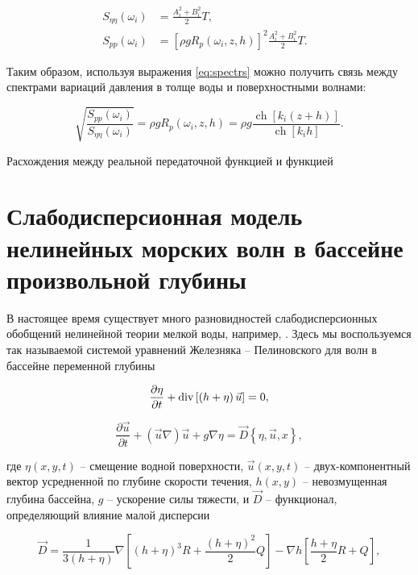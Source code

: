 \begin{align}\label{eq:spectrs}
S_{\eta\eta}(\omega_i)&=\frac{A_i^2+B_i^2}{2}T,&\\
S_{pp}(\omega_i)&=[\rho gR_p(\omega_i,z,h)]^2\frac{A_i^2+B_i^2}{2}T.&
\end{align}

Таким образом, используя выражения \eqref{eq:spectrs} можно получить связь между спектрами вариаций давления в толще воды и поверхностными волнами:

\begin{equation}\label{eq:spectrsRelat}
  \sqrt{\frac{S_{pp}(\omega_i)}{S_{\eta\eta}(\omega_i)}}=\rho gR_p(\omega_i,z,h)=\rho g\frac{\operatorname{ch}[k_i(z+h)]}{\operatorname{ch}[k_ih]}.
\end{equation}
\noindent

Расхождения между реальной передаточной функцией и функцией 

\section{Слабодисперсионная модель нелинейных морских волн в бассейне произвольной глубины }
В настоящее время существует много разновидностей слабодисперсионных обобщений нелинейной теории мелкой воды, например, \cite{Green_1976}\cite{Zhel_1985} \cite{Fedotova_2008} \cite{Fedotova_2012}. Здесь мы воспользуемся так называемой системой уравнений Железняка -- Пелиновского для волн в бассейне переменной глубины \cite{Zhel_Pel_1985}

\begin{equation} \label{GrindEQ__1_}
\frac{\partial \eta }{\partial t} +{\rm div}\left[\left(h+\eta \right)\vec{u}\right]=0,
\end{equation}

\begin{equation} \label{GrindEQ__2_}
\frac{\partial \vec{u}}{\partial t} +(\vec{u}\nabla )\vec{u}+g\nabla \eta =\vec{D}\left\{\eta ,\vec{u},x\right\},
\end{equation}


где $\eta(x,y,t)$ -- смещение водной поверхности, $\vec{u}(x,y,t)$ -- двух-компонентный вектор усредненной по глубине скорости течения, $h(x,y)$ -- невозмущенная глубина бассейна, $g$ -- ускорение силы тяжести, и $\vec{D}$ -- функционал, определяющий влияние малой дисперсии


\begin{equation} \label{GrindEQ__3_}
\vec{D}=\frac{1}{3\left(h+\eta \right)} \nabla \left[\left(h+\eta \right)^{3} R+\frac{(h+\eta )^{2} }{2} Q\right]-\nabla h\left[\frac{h+\eta }{2} R+Q\right],
\end{equation}

